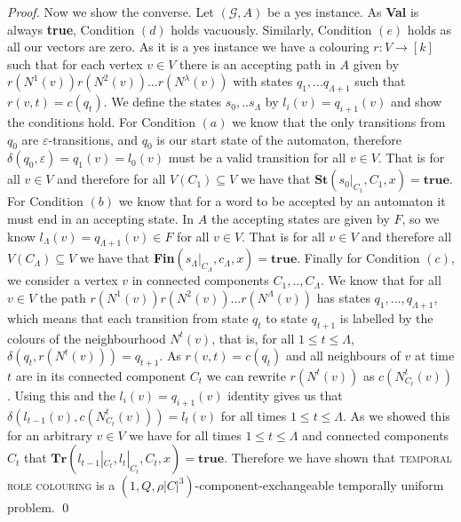 \documentclass[10pt,a4paper]{amsart}
\begin{document}
\begin{proof}
Now we show the converse. Let $(\mathcal{G},A)$ be a yes instance. As \textbf{Val}  is always \textbf{true}, Condition $(d)$ holds vacuously. Similarly, Condition $(e)$ holds as all our vectors are zero. 
As it is a yes instance we have a colouring $r:V \rightarrow [k]$ such that for each vertex $v \in V$ there is an accepting path in $A$ given by $r(N^1(v))r(N^2(v))...r(N^\lambda(v))$  with states $q_1,...q_{\Lambda+1}$ such that $r(v,t)=c(q_t)$. We define the states $s_0,..s_\Lambda$ by $l_i(v)=q_{i+1}(v)$ and show the conditions hold. 
For Condition $(a)$ we know that the only transitions from $q_0$ are $\varepsilon$-transitions, and $q_0$ is our start state of the automaton, therefore $\delta(q_0,\varepsilon)=q_1(v)=l_0(v)$ must be a valid transition for all $v\in V$. That is for all $v\in V$ and therefore for all $V(C_1) \subseteq V$ we have that $\textbf{St}(s_0|_{C_1}, C_1,x) = \textbf{true}$.
For Condition $(b)$ we know that for a word to be accepted by an automaton it must end in an accepting state. In $A$ the accepting states are given by $F$, so we know $l_{\Lambda}(v)=q_{\Lambda+1}(v) \in F$ for all $v \in V$. That is for all $v \in V$ and therefore all $V(C_\Lambda) \subseteq V$ we have that \textbf{Fin}$(s_\Lambda|_{C_\Lambda},c_\Lambda,x)=\textbf{true}$. Finally for Condition $(c)$, we consider a vertex $v$ in connected components $C_1,..,C_\Lambda$. We know that for all $v\in V$ the path $r(N^1(v))r(N^2(v))...r(N^\Lambda(v))$ has states $q_1,...,q_{\Lambda+1}$, which means that each transition from state $q_t$ to state $q_{t+1}$ is labelled by the colours of the neighbourhood $N^t(v)$, that is, for all $1\leq t \leq \Lambda$, $\delta(q_t,r(N^t(v)))=q_{t+1}$. As $r(v,t)=c(q_t)$ and all neighbours of $v$ at time $t$ are in its connected component $C_t$ we can rewrite $r(N^t(v))$ as $c(N_{C_t}^t(v))$. Using this and the $l_i(v)=q_{i+1}(v)$ identity gives us that $\delta(l_{t-1}(v),c(N^t_{C_t}(v)))=l_t(v)$ for all times $1 \leq t \leq \Lambda$. As we showed this for an arbitrary $v\in V$ we have for all times $1\leq t \leq \Lambda$ and connected components $C_t$ that $\textbf{Tr}(l_{t-1}|_{C_t},l_t|_{C_t},C_t,x) = \textbf{true}$.
Therefore we have shown that \textsc{temporal role colouring} is a $(1,Q,\rho|C|^3)$-component-exchangeable temporally uniform problem.
\qed \end{proof}
\end{document}
